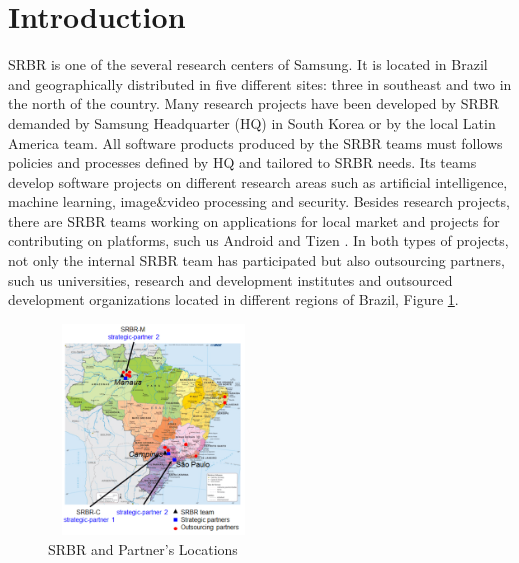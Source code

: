 

\section{Introduction\label{sec:sec1}}

SRBR is one of the several research centers of Samsung. It is located in Brazil and geographically distributed in five different sites: three in southeast and two in the north of the country. 
Many research projects have been developed by SRBR demanded by Samsung Headquarter (HQ) in South Korea or by the local Latin America team. All software products produced by the SRBR teams must follows policies and processes defined by HQ and tailored to SRBR needs. Its teams develop software projects on different research areas such as artificial intelligence, machine learning, image\&video processing and security. Besides research projects, there are SRBR teams working on applications for local market and projects for contributing on platforms, such us Android \cite{Android18} and Tizen \cite{Tizen18}. 
 In both types of projects, not only the internal SRBR team has participated but also outsourcing partners, such us universities, research and development institutes and outsourced development organizations located in different regions of Brazil, Figure \ref{fig:mapa}.
 
\begin{figure}[!h]
\includegraphics[height=2.2in, width=2.2in]{BrazilMap-min}
\caption{SRBR and Partner's Locations}
\label{fig:mapa}
\end{figure}

